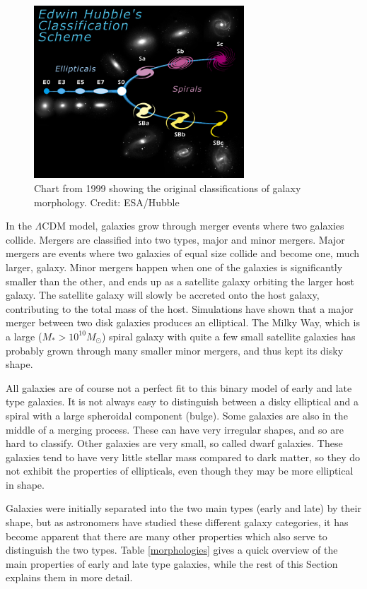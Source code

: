 \begin{figure}
    \centering
    \includegraphics[width=0.7\textwidth]{images/hubble.jpg}
    \caption{Chart from 1999 showing the original classifications of galaxy morphology. Credit: ESA/Hubble}
    \label{hubble}
\end{figure}

In the $\Lambda$CDM model, galaxies grow through merger events where two galaxies collide. Mergers are classified into two types, major and minor mergers. Major mergers are events where two galaxies of equal size collide and become one, much larger, galaxy. Minor mergers happen when one of the galaxies is significantly smaller than the other, and ends up as a satellite galaxy orbiting the larger host galaxy. The satellite galaxy will slowly be accreted onto the host galaxy, contributing to the total mass of the host. Simulations have shown that a major merger between two disk galaxies produces an elliptical. The Milky Way, which is a large ($M_*>10^{10} M_\odot$) spiral galaxy with quite a few small satellite galaxies has probably grown through many smaller minor mergers, and thus kept its disky shape.

All galaxies are of course not a perfect fit to this binary model of early and late type galaxies. It is not always easy to distinguish between a disky elliptical and a spiral with a large spheroidal component (bulge). Some galaxies are also in the middle of a merging process. These can have very irregular shapes, and so are hard to classify. Other galaxies are very small, so called dwarf galaxies. These galaxies tend to have very little stellar mass compared to dark matter, so they do not exhibit the properties of ellipticals, even though they may be more elliptical in shape.

Galaxies were initially separated into the two main types (early and late) by their shape, but as astronomers have studied these different galaxy categories, it has become apparent that there are many other properties which also serve to distinguish the two types. Table \ref{morphologies} gives a quick overview of the main properties of early and late type galaxies, while the rest of this Section explains them in more detail.


